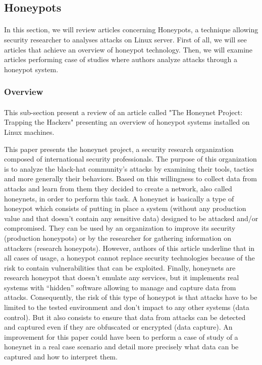 \subsection{Honeypots} %

\paragraph{}

In this section, we will review articles concerning Honeypots, a technique allowing security
researcher to analyses attacks on Linux server. First of all, we will see articles that
achieve an overview of honeypot technology. Then, we will examine articles performing case
of studies where authors analyze attacks through a honeypot system.

\subsubsection{Overview} %

\paragraph{}

This sub-section present a review of an article called "The Honeynet Project: Trapping
the Hackers" presenting an overview of honeypot systems installed on Linux machines.

This paper presents the honeynet project, a security research organization composed of
international security professionals. The purpose of this organization is to analyze the
black-hat community’s attacks by examining their tools, tactics and more generally their
behaviors. Based on this willingness to collect data from attacks and learn from them they
decided to create a network, also called honeynets, in order to perform this task.
A honeynet is basically a type of honeypot which consists of putting in place a system
(without any production value and that doesn’t contain any sensitive data) designed to be
attacked and/or compromised. They can be used by an organization to improve its security 
(production honeypots) or by the researcher for gathering information on attackers 
(research honeypots). However, authors of this article underline that in all cases of usage,
a honeypot cannot replace security technologies because of the risk to contain vulnerabilities
that can be exploited. Finally, honeynets are research honeypot that doesn't emulate any
services, but it implements real systems with “hidden” software allowing to manage and
capture data from attacks. Consequently, the risk of this type of honeypot is that attacks
have to be limited to the tested environment and don’t impact to any other systems
(data control). But it also consists to ensure that data from attacks can be detected and
captured even if they are obfuscated or encrypted (data capture). An improvement for this
paper could have been to perform a case of study of a honeynet in a real case scenario and
detail more precisely what data can be captured and how to interpret them.

